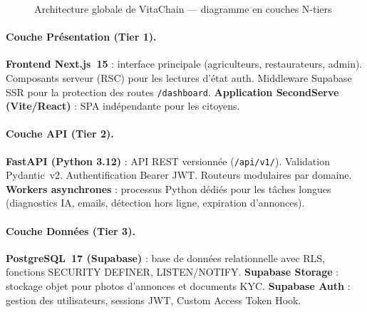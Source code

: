 \documentclass[12pt,a4paper]{report}
\newcommand{\code}[1]{\texttt{\small #1}}
\begin{document}
\begin{figure}[H]
\caption{Architecture globale de VitaChain --- diagramme en couches N-tiers}
\label{fig:2.8}
\end{figure}

\paragraph{Couche Présentation (Tier 1).}
\textbf{Frontend Next.js~15} : interface principale (agriculteurs, restaurateurs,
admin). Composants serveur (RSC) pour les lectures d'état auth. Middleware Supabase
SSR pour la protection des routes \code{/dashboard}. \textbf{Application SecondServe
(Vite/React)} : SPA indépendante pour les citoyens.

\paragraph{Couche API (Tier 2).}
\textbf{FastAPI (Python 3.12)} : API REST versionnée (\code{/api/v1/}). Validation
Pydantic~v2. Authentification Bearer JWT. Routeurs modulaires par domaine.
\textbf{Workers asynchrones} : processus Python dédiés pour les tâches longues
(diagnostics IA, emails, détection hors ligne, expiration d'annonces).

\paragraph{Couche Données (Tier 3).}
\textbf{PostgreSQL~17 (Supabase)} : base de données relationnelle avec RLS,
fonctions SECURITY DEFINER, LISTEN/NOTIFY. \textbf{Supabase Storage} : stockage
objet pour photos d'annonces et documents KYC. \textbf{Supabase Auth} : gestion
des utilisateurs, sessions JWT, Custom Access Token Hook.
\end{document}
